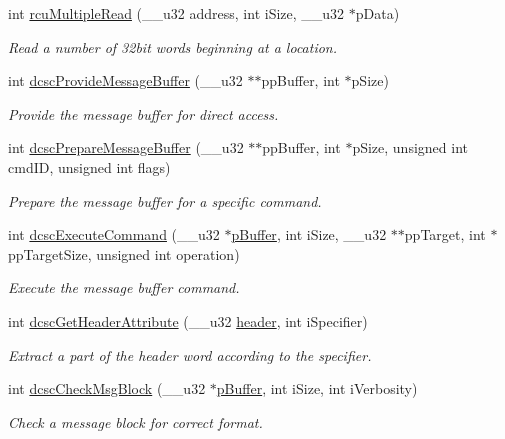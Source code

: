\begin{CompactItemize}
int \hyperlink{group__dcsc__msg__buffer__access_g602216accce6913989f8b04b36157cd6}{rcu\-Multiple\-Read} (\_\-\_\-u32 address, int i\-Size, \_\-\_\-u32 $\ast$p\-Data)
\begin{CompactList}\small\item\em Read a number of 32bit words beginning at a location. \item\end{CompactList}\item 
int \hyperlink{group__dcsc__msg__buffer__access_gf7be7371f7530e8eb6e07e6f0d969b04}{dcsc\-Provide\-Message\-Buffer} (\_\-\_\-u32 $\ast$$\ast$pp\-Buffer, int $\ast$p\-Size)
\begin{CompactList}\small\item\em Provide the message buffer for direct access. \item\end{CompactList}\item 
int \hyperlink{group__dcsc__msg__buffer__access_g4f25fcb80c8fad99d5d72f96e72bd941}{dcsc\-Prepare\-Message\-Buffer} (\_\-\_\-u32 $\ast$$\ast$pp\-Buffer, int $\ast$p\-Size, unsigned int cmd\-ID, unsigned int flags)
\begin{CompactList}\small\item\em Prepare the message buffer for a specific command. \item\end{CompactList}\item 
int \hyperlink{group__dcsc__msg__buffer__access_g96f1fe73877d927a698a396df555767e}{dcsc\-Execute\-Command} (\_\-\_\-u32 $\ast$\hyperlink{dcscMsgBufferInterface_8c_7fe69f55846ac3a138c130665f1f1e49}{p\-Buffer}, int i\-Size, \_\-\_\-u32 $\ast$$\ast$pp\-Target, int $\ast$pp\-Target\-Size, unsigned int operation)
\begin{CompactList}\small\item\em Execute the message buffer command. \item\end{CompactList}\item 
int \hyperlink{group__dcsc__msg__buffer__access_g975e68b162a4d0786e1902c895349b02}{dcsc\-Get\-Header\-Attribute} (\_\-\_\-u32 \hyperlink{virtex__io_8h_f662138894a99f1d07d07f482b7c2691}{header}, int i\-Specifier)
\begin{CompactList}\small\item\em Extract a part of the header word according to the specifier. \item\end{CompactList}\item 
int \hyperlink{group__dcsc__msg__buffer__access_g8dac87332689e82a586ef04eed99d083}{dcsc\-Check\-Msg\-Block} (\_\-\_\-u32 $\ast$\hyperlink{dcscMsgBufferInterface_8c_7fe69f55846ac3a138c130665f1f1e49}{p\-Buffer}, int i\-Size, int i\-Verbosity)
\begin{CompactList}\small\item\em Check a message block for correct format. \item\end{CompactList}\end{CompactItemize}
